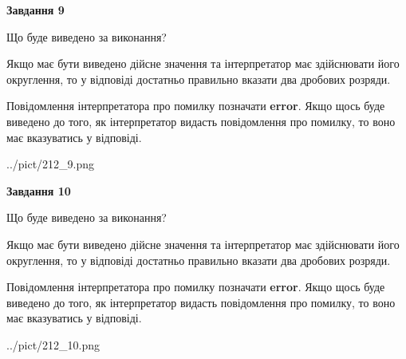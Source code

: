 \documentclass[12pt, ukrainian]{article}
\begin{document}
{\begin {Large}
{\begin {center}\textbf{Завдання 9}\end {center}}\par
Що буде виведено за виконання? \par

Якщо має бути виведено дійсне значення та інтерпретатор має здійснювати його округлення, 
то у відповіді достатньо правильно вказати два дробових розряди.

Повідомлення інтерпретатора про помилку позначати \textbf{error}.
Якщо щось буде виведено до того, як інтерпретатор видасть повідомлення про помилку, 
то воно має вказуватись у відповіді. \par

\begin{center}
	{../pict/212_9.png}
\end{center}
\newpage

{\begin {center}\textbf{Завдання 10}\end {center}}\par
Що буде виведено за виконання? \par

Якщо має бути виведено дійсне значення та інтерпретатор має здійснювати його округлення, 
то у відповіді достатньо правильно вказати два дробових розряди.

Повідомлення інтерпретатора про помилку позначати \textbf{error}.
Якщо щось буде виведено до того, як інтерпретатор видасть повідомлення про помилку, 
то воно має вказуватись у відповіді. \par

\begin{center}
	{../pict/212_10.png}
\end{center}
\newpage

\end {Large}}
\end{document}
